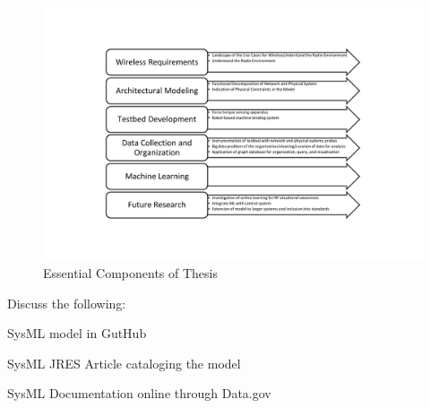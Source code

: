 \begin{figure}[!tbp]
	\includegraphics[width=1.0\textwidth]{chapter-intro/diagrams/Slide2}
	\caption{Essential Components of Thesis}\label{intro:thesis-org:fig:outline}
\end{figure}


Discuss the following:

SysML model in GutHub ~\cite{Candell2018SysML.GitHub}

SysML JRES Article cataloging the model~\cite{Candell2018SysML.JRES}

SysML Documentation online through Data.gov~\cite{Candell2018SysML.DATA}

